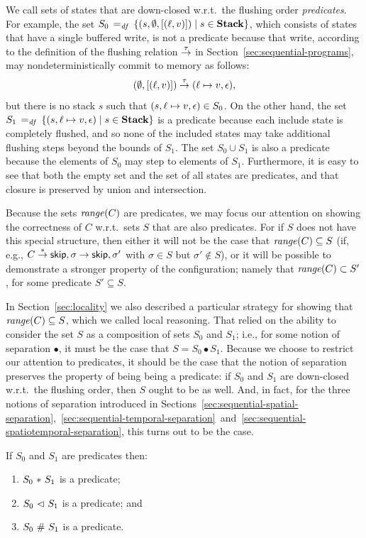 \documentclass[11pt]{report}
\begin{document}
We call sets of states that are down-closed w.r.t.\ the flushing order \emph{predicates}. For example, the set $S_0 \operatorname{\;=_{\mathit{df}}\;} \left\lbrace (s,\operatorname{\emptyset},\left[(\ell,v)\right]) \mid s \in \mathbf{Stack} \right\rbrace$, which consists of states that have a single buffered write, is not a predicate because that write, according to the definition of the flushing relation $\stackrel{\tau}{\rightarrow}$ in Section~\ref{sec:sequential-programs}, may nondeterministically commit to memory as follows: \[(\operatorname{\emptyset},\left[(\ell,v)\right]) \stackrel{\tau}{\rightarrow} (\ell \mapsto v,\epsilon),\] but there is no stack $s$ such that $(s, \ell \mapsto v, \epsilon) \in S_0$. On the other hand, the set $S_1 \operatorname{\;=_{\mathit{df}}\;} \left\lbrace (s,\ell \mapsto v,\epsilon) \mid s \in \mathbf{Stack} \right\rbrace$ is a predicate because each include state is completely flushed, and so none of the included states may take additional flushing steps beyond the bounds of $S_1$. The set $S_0 \cup S_1$ is also a predicate because the elements of $S_0$ may step to elements of $S_1$. Furthermore, it is easy to see that both the empty set and the set of all states are predicates, and that closure is preserved by union and intersection. 

Because the sets $\mathit{range}(C)$ are predicates, we may focus our attention on showing the correctness of $C$ w.r.t.\ sets $S$ that are also predicates. For if $S$ does not have this special structure, then either it will not be the case that $\mathit{range}(C) \subseteq S$ (if, e.g., $C \stackrel{\ast}{\rightarrow} \operatorname{\mathsf{skip}},\sigma \rightarrow \operatorname{\mathsf{skip}},\sigma'$ with $\sigma \in S$ but $\sigma' \notin S$), or it will be possible to demonstrate a stronger property of the configuration; namely that $\mathit{range}(C) \subset S'$, for some predicate $S' \subseteq S$. 

In Section~\ref{sec:locality} we also described a particular strategy for showing that $\mathit{range}(C) \subseteq S$, which we called local reasoning. That relied on the ability to consider the set $S$ as a composition of sets $S_0$ and $S_1$; i.e., for some notion of separation $\bullet$, it must be the case that $S = S_0 \bullet S_1$. Because we choose to restrict our attention to predicates, it should be the case that the notion of separation preserves the property of being being a predicate: if $S_0$ and $S_1$ are down-closed w.r.t.\ the flushing order, then $S$ ought to be as well. And, in fact, for the three notions of separation introduced in Sections~\ref{sec:sequential-spatial-separation},~\ref{sec:sequential-temporal-separation}~and~\ref{sec:sequential-spatiotemporal-separation}, this turns out to be the case. 

\begin{lemma}
    \label{lem:separation-preserves-closure}    
    If $S_0$ and $S_1$ are predicates then: 
    \begin{enumerate}
        \item $S_0 \operatorname{\,\ast\,} S_1$ is a predicate; 
        \item $S_0 \operatorname{\,\vartriangleleft\,} S_1$ is a predicate; and 
        \item $S_0 \operatorname{\,\#\,} S_1$ is a predicate.
    \end{enumerate}
\end{lemma}
\end{document}

